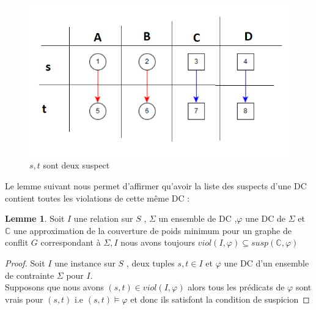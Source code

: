 \documentclass[letterpaper, 12pt]{report}
\theoremstyle{definition}
\newtheorem{mylemma}{Lemme}
\begin{document}
\begin{figure}
\centering
\includegraphics[scale=1]{img/suspect1.png}
\caption{\label{suspect1} $s,t$ sont deux suspect }
\end{figure}

Le lemme suivant nous permet d'affirmer qu'avoir la liste des suspects d'une DC contient toutes les violations de cette même DC \cite{main} :
\begin{mylemma}
Soit $I$ une relation sur $S$ , $\Sigma$ un ensemble de DC ,$\varphi$ une DC de $\Sigma$ et $\mathbb{C}$ une approximation de la couverture de poids minimum pour un graphe de conflit $G$ correspondant à  $\Sigma,I$ nous avons toujours $viol(I,\varphi) \subseteq susp(\mathbb{C},\varphi)$
 \end{mylemma}
 
 \begin{proof}
 Soit $I$ une instance sur $S$ , deux tuples $s,t \in I$ et $\varphi$ une DC d'un ensemble de contrainte $\Sigma$ pour $I$.\\
 Supposons que nous avons $(s,t) \in viol(I,\varphi)$ alors tous les prédicats de $\varphi$ sont vrais pour $(s,t)$ i.e $(s,t) \models \varphi$ et donc ils satisfont la condition de suspicion
 \end{proof}
\end{document}
